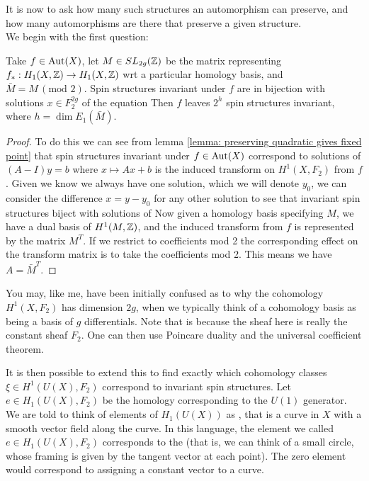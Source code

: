 \documentclass{article}
\begin{document}
It is now to ask how many such structures an automorphism can preserve, and how many automorphisms are there that preserve a given structure.\\
We begin with the first question:
\begin{theorem}
	Take $f \in \operatorname{Aut}(X)$, let $M \in SL_{2g}(\mathbb{Z})$ be the matrix representing $f_\ast : H_1(X,\mathbb{Z}) \to H_1(X, \mathbb{Z})$ wrt a particular homology basis, and $\bar{M}=M \, (\text{mod }2)$. Spin structures invariant under $f$ are in bijection with solutions $x \in F_2^{2g}$ of the equation 
Then $f$ leaves $2^h$ spin structures invariant, where $h = \dim E_1(\bar{M})$. 
\end{theorem}
\begin{proof}
 To do this we can see from lemma \ref{lemma: preserving quadratic gives fixed point} that spin structures invariant under $f \in \operatorname{Aut}(X)$ correspond to solutions of $(A-I)y=b$ where $x \mapsto Ax+b$ is the induced transform on $H^1(X,F_2)$ from $f$. Given we know we always have one solution, which we will denote $y_0$, we can consider the difference $x=y-y_0$ for any other solution to see that invariant spin structures biject with solutions of 
Now given a homology basis specifying $M$, we have a dual basis of $H^1(M,\mathbb{Z})$, and the induced transform from $f$ is represented by the matrix $M^T$. If we restrict to coefficients mod 2 the corresponding effect on the transform matrix is to take the coefficients mod 2. This means we have $A = \bar{M}^T$. 
\end{proof}
\begin{remark}
	You may, like me, have been initially confused as to why the cohomology $H^1(X,F_2)$ has dimension $2g$, when we typically think of a cohomology basis as being a basis of $g$ differentials. Note that is because the sheaf here is really the constant sheaf $F_2$. One can then use Poincare duality and the universal coefficient theorem.
\end{remark} 

It is then possible to extend this to find exactly which cohomology classes $\xi \in H^1(U(X),F_2)$ correspond to invariant spin structures. Let $e \in H_1(U(X),F_2)$ be the homology corresponding to the $U(1)$ generator. We are told to think of elements of $H_1(U(X))$ as , that is a curve in $X$ with a smooth vector field along the curve. In this language, the element we called $e \in H_1(U(X), F_2)$ corresponds to the  (that is, we can think of a small circle, whose framing is given by the tangent vector at each point). The zero element would correspond to assigning a constant vector to a curve.   
\end{document}
